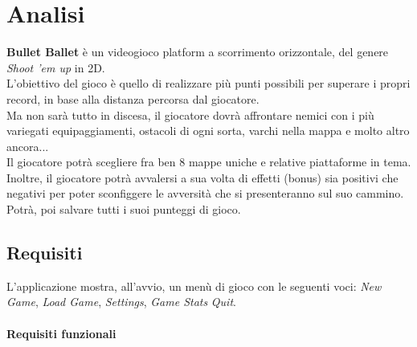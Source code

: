 
\chapter{Analisi}

\textsf{\small \textbf{Bullet Ballet} è un videogioco platform a scorrimento orizzontale, del genere \emph{Shoot 'em up} in 2D.}\\
\textsf{\small L'obiettivo del gioco è quello di realizzare più punti possibili per superare i propri record, in base alla distanza percorsa dal giocatore.}\\

\textsf{\small Ma non sarà tutto in discesa, il giocatore dovrà affrontare nemici con i più variegati equipaggiamenti, ostacoli di ogni sorta, varchi nella mappa e molto altro ancora...}\\
\textsf{\small Il giocatore potrà scegliere fra ben 8 mappe uniche e relative piattaforme in tema.}\\

\textsf{\small Inoltre, il giocatore potrà avvalersi a sua volta di effetti (bonus) sia positivi che negativi per poter sconfiggere le avversità che si presenteranno sul suo cammino.}\\

\textsf{\small Potrà, poi salvare tutti i suoi punteggi di gioco.}\\

\section{Requisiti}

\textsf{\small L'applicazione mostra, all'avvio, un menù di gioco con le seguenti voci: \emph{New Game}, \emph{Load Game}, \emph{Settings}, \emph{Game Stats} \emph{Quit}.}\\

\subsubsection{Requisiti funzionali}

